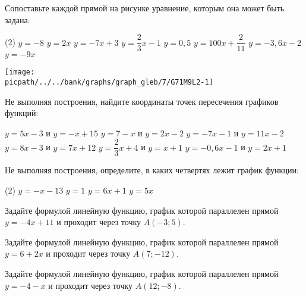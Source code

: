 \begin{class}[number=2]
	\begin{listofex}
		\item Сопоставьте каждой прямой на рисунке уравнение, которым она может быть задана:
		\begin{tasks}(2)
			\task \( y=-8 \)
			\task \( y=2x \)
			\task \( y=-7x+3 \)
			\task \( y=\dfrac{ 2 }{3  }x-1 \)
			\task \( y=0,5 \)
			\task \( y=100x+\dfrac{ 2 }{ 11 } \)
			\task \( y=-3,6x-2 \)
			\task \( y=-9x \)
		\end{tasks}
		\begin{minipage}[t]{\linewidth}
			\texttt{[image: \\picpath/../../bank/graphs/graph\_gleb/7/G71M9L2-1]}
		\end{minipage}
		\item Не выполняя построения, найдите координаты точек пересечения графиков функций:
		\begin{tasks}
			\task \( y=5x-3 \) и \( y=-x+15 \)
			\task \( y=7-x \) и \( y=2x-2 \)
			\task \( y=-7x-1 \) и \( y=11x-2 \)
			\task \( y=8x-3 \) и \( y=7x+12 \)
			\task \( y=\dfrac{ 2 }{ 3 }x+4 \) и \( y=x+1 \)
			\task \( y=-0,6x-1 \) и \( y=2x+1 \)
		\end{tasks}
		\item Не выполняя построения, определите, в каких четвертях лежит график функции:
		\begin{tasks}(2)
			\task \( y=-x-13 \)
			\task \( y=1 \)
			\task \( y=6x+1 \)
			\task \( y=5x \)
		\end{tasks}
		\item Задайте формулой линейную функцию, график которой параллелен прямой \(y=-4x+11\) и проходит через точку \(A(- 3; 5)\).
		\item Задайте формулой линейную функцию, график которой параллелен прямой \(y=6+2x\) и проходит через точку \(A(7; -12)\).
		\item Задайте формулой линейную функцию, график которой параллелен прямой \(y=-4-x\) и проходит через точку \(A(12; -8)\).
	\end{listofex}
\end{class}

